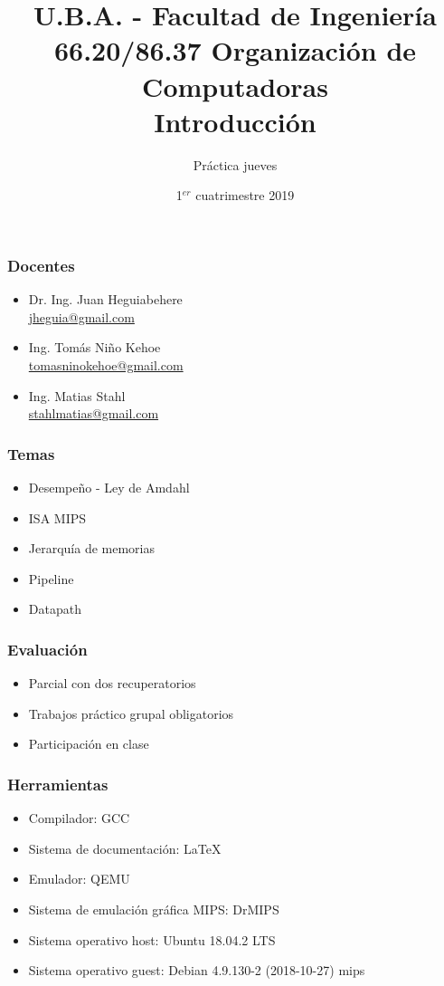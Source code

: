 \documentclass{beamer}
\title[66.20/86.37]{U.B.A. - Facultad de Ingeniería\\\vspace{0.25cm} 66.20/86.37 Organización de Computadoras
  \\Introducción}
\author{Práctica jueves}
\date{1$^{er}$ cuatrimestre 2019}
\begin{document}
\begin{frame}
\titlepage %
\end{frame}

\begin{frame}
 \frametitle{Docentes}
 \begin{itemize}
  \item Dr. Ing. Juan Heguiabehere\\ \href{mailto:jheguia@gmail.com}{jheguia@gmail.com}
  \item Ing. Tomás Niño Kehoe\\ \href{tomasninokehoe@gmail.com}{tomasninokehoe@gmail.com}
  \item Ing. Matias Stahl\\ \href{stahlmatias@gmail.com}{stahlmatias@gmail.com}
 \end{itemize}
\end{frame}

 \begin{frame}
 \frametitle{Temas}
 \begin{itemize}
  \item Desempeño - Ley de Amdahl
  \item ISA MIPS
  \item Jerarquía de memorias
  \item Pipeline
  \item Datapath
\end{itemize}
 \end{frame}

 \begin{frame}
 \frametitle{Evaluación}
 \begin{itemize}
\item Parcial con dos recuperatorios
\item Trabajos práctico grupal obligatorios
\item Participación en clase
\end{itemize}
 \end{frame}

\begin{frame}
 \frametitle{Herramientas}
 \begin{itemize}
  \item  Compilador: GCC
  \item Sistema de documentación: \LaTeX
  \item Emulador: QEMU
  \item Sistema de emulación gráfica MIPS: DrMIPS
  \item Sistema operativo host: Ubuntu 18.04.2 LTS 
  \item Sistema operativo guest: Debian 4.9.130-2 (2018-10-27) mips
 \end{itemize}
 \end{frame}
 
\end{document}
